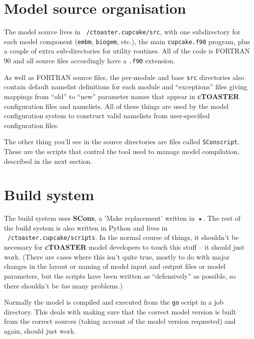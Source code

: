 \documentclass[a4paper,10pt,article]{memoir}
\begin{document}
\section{Model source organisation}

The model source lives in \texttt{~/ctoaster.cupcake/src}, with one subdirectory
for each model component (\texttt{embm}, \texttt{biogem}, etc.), the
main \texttt{cupcake.f90} program, plus a couple of extra sub-directories
for utility routines.  All of the code is FORTRAN 90 and all source
files accordingly have a \texttt{.f90} extension.

As well as FORTRAN source files, the per-module and base \texttt{src}
directories also contain default namelist definitions for each module
and ``exceptions'' files giving mappings from ``old'' to ``new''
parameter names that appear in \textbf{cTOASTER} configuration files and
namelists.  All of these things are used by the model configuration
system to construct valid namelists from user-specified configuration
files.

The other thing you'll see in the source directories are files called
\texttt{SConscript}.  These are the scripts that control the tool used
to manage model compilation, described in the next section.

\section{Build system}
\label{sec:build-system}

The build system uses \textbf{SCons}, a 'Make replacement' written in
\textbf{•}.  The rest of the build system is also written in Python
and lives in \texttt{~/ctoaster.cupcake/scripts}.  In the normal course of
things, it shouldn't be necessary for \textbf{cTOASTER} model developers to touch
this stuff -- it should just work.  (There are cases where this isn't
quite true, mostly to do with major changes in the layout or naming of
model input and output files or model parameters, but the scripts have
been written as ``defensively'' as possible, so there shouldn't be
\emph{too} many problems.)

Normally the model is compiled and executed from the \texttt{go}
script in a job directory.  This deals with making sure that the
correct model version is built from the correct sources (taking
account of the model version requested) and again, should just work.
\end{document}
